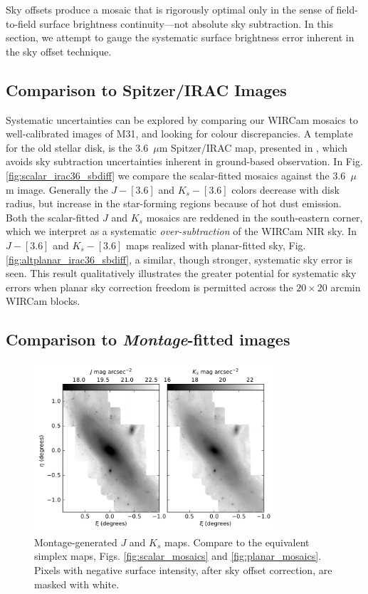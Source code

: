 \documentclass[iop]{emulateapj}
\newcommand{\sw}[1]{\textit{#1}} %
\begin{document}
Sky offsets produce a mosaic that is rigorously optimal only in the sense of field-to-field surface brightness continuity---not absolute sky subtraction. In this section, we attempt to gauge the systematic surface brightness error inherent in the sky offset technique.

\subsection{Comparison to Spitzer/IRAC Images}

Systematic uncertainties can be explored by comparing our WIRCam mosaics to well-calibrated images of M31, and looking for colour discrepancies.
A template for the old stellar disk, is the 3.6~$\mu$m Spitzer/IRAC map, presented in \cite{Barmby:2006}, which avoids sky subtraction uncertainties inherent in ground-based observation.
In Fig. \ref{fig:scalar_irac36_sbdiff} we compare the scalar-fitted mosaics against the 3.6~$\mu$m image. Generally the $J-[3.6]$ and $K_s-[3.6]$ colors decrease with disk radius, but increase in the star-forming regions because of hot dust emission. Both the scalar-fitted $J$ and $K_s$ mosaics are reddened in the south-eastern corner, which we interpret as a systematic \emph{over-subtraction} of the WIRCam NIR sky. In $J-[3.6]$ and $K_s-[3.6]$ maps realized with planar-fitted sky, Fig. \ref{fig:altplanar_irac36_sbdiff}, a similar, though stronger, systematic sky error is seen. This result qualitatively illustrates the greater potential for systematic sky errors when planar sky correction freedom is permitted across the $20\times 20$ arcmin WIRCam blocks.

\subsection{Comparison to \sw{Montage}-fitted images}

\begin{figure}[t]
    \centering
        \includegraphics[width=3.5in]{figs/montage_planar_mosaics.pdf}
    \caption{Montage-generated $J$ and $K_s$ maps. Compare to the equivalent simplex maps, Figs. \ref{fig:scalar_mosaics} and \ref{fig:planar_mosaics}. Pixels with negative surface intensity, after sky offset correction, are masked with white.}
    \label{fig:montage_planar_mosaics}
\end{figure}
\end{document}
